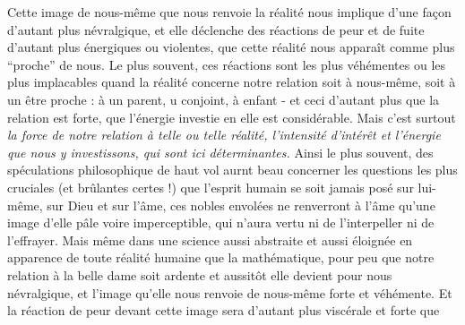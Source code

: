 Cette image de nous-même que nous renvoie la réalité nous implique d'une façon d'autant plus névralgique, et elle déclenche des réactions de peur et de fuite d'autant plus énergiques ou violentes, que cette réalité nous apparaît comme plus ``proche'' de nous. Le plus souvent, ces réactions sont les plus véhémentes ou les plus implacables quand la réalité concerne notre relation soit à nous-même, soit à un être proche : à un parent, u conjoint, à  enfant - et ceci d'autant plus que la relation est forte, que l'énergie investie en elle est considérable. Mais c'est surtout \textit{la force de notre relation à telle ou telle réalité, l'intensité d'intérêt et l'énergie que nous y investissons, qui sont ici déterminantes.} Ainsi le plus souvent, des spéculations philosophique de haut vol  aurnt beau concerner les questions les plus cruciales (et brûlantes certes !) que l'esprit humain se soit jamais posé sur lui-même, sur Dieu et sur l'âme, ces nobles envolées ne renverront à l'âme qu'une image d'elle pâle voire imperceptible, qui n'aura vertu ni de l'interpeller ni de l'effrayer. Mais même dans une science aussi abstraite et aussi éloignée en apparence de toute réalité humaine que la mathématique, pour peu que notre relation à la belle dame soit ardente et aussitôt elle devient pour nous névralgique, et l'image qu'elle nous renvoie de nous-même forte et véhémente. Et la réaction de peur devant cette image sera d'autant plus viscérale et forte que
\margin{$\cdot$}
\margin{$\cdot$}
\margin{$\cdot\ \cdot$}



